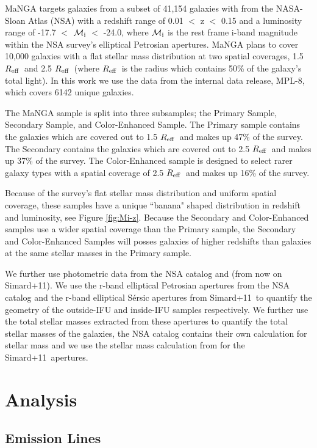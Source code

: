 \documentclass[iop,revtex4,twocolumn,apj,numberedappendix,appendixfloats]{emulateapj}
\newcommand{\reff}{$R_{\rm eff}$}
\newcommand{\simard}{Simard+11}
\begin{document}
MaNGA targets galaxies from a subset of 41,154 galaxies with from the NASA-Sloan Atlas (NSA) with a redshift range of 0.01 $<$ z $<$ 0.15 and a luminosity range of -17.7 $<$ $\mathcal{M_{\rm i}}$ $<$ -24.0, where $\mathcal{M_{\rm i}}$ is the rest frame i-band magnitude within the NSA survey's elliptical Petrosian apertures. MaNGA plans to cover 10,000 galaxies with a flat stellar mass distribution at two spatial coverages, 1.5 \reff\ and 2.5 \reff\ (where \reff\ is the radius which contains 50\% of the galaxy's total light). In this work we use the data from the internal data release, MPL-8, which covers 6142 unique galaxies. 

The MaNGA sample is split into three subsamples; the Primary Sample, Secondary Sample, and Color-Enhanced Sample. The Primary sample contains the galaxies which are covered out to 1.5 \reff\ and makes up 47\% of the survey. The Secondary contains the galaxies which are covered out to 2.5 \reff\ and makes up 37\% of the survey. The Color-Enhanced sample is designed to select rarer galaxy types with a spatial coverage of 2.5 \reff\ and makes up 16\% of the survey. 

Because of the survey's flat stellar mass distribution and uniform spatial coverage, these samples have a unique ``banana" shaped distribution in redshift and luminosity, see Figure \ref{fig:Mi-z}. Because the Secondary and Color-Enhanced samples use a wider spatial coverage than the Primary sample, the Secondary and Color-Enhanced Samples will posses galaxies of higher redshifts than galaxies at the same stellar masses in the Primary sample. 

We further use photometric data from the NSA catalog and \citet{Simard:2011} (from now on \simard). We use the r-band elliptical Petrosian apertures from the NSA catalog and the r-band elliptical S\'ersic apertures from \simard\ to quantify the geometry of the outside-IFU and inside-IFU samples respectively. We further use the total stellar masses extracted from these apertures to quantify the total stellar masses of the galaxies, the NSA catalog contains their own calculation for stellar mass and we use the stellar mass calculation from \citet{Mendel:2014} for the \simard\ apertures.

\section{Analysis}\label{sec:analysis}
\subsection{Emission Lines}
\end{document}
